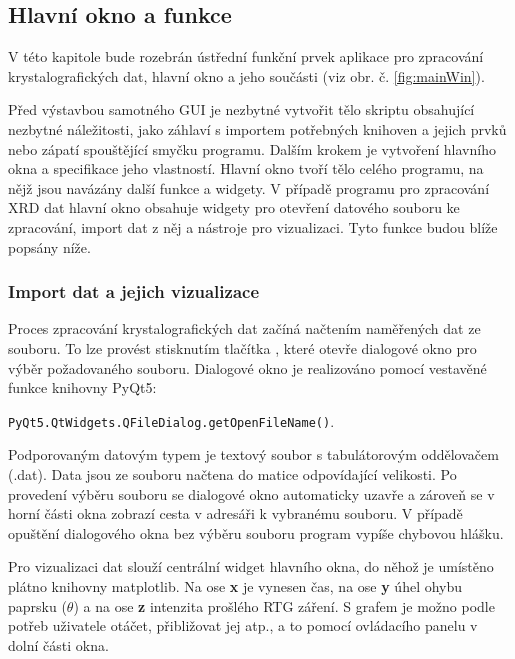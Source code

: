 \documentclass[a4paper, 12pt]{article}
\begin{document}
\subsection{Hlavní okno a funkce} \label{sec:mainwin}
V této kapitole bude rozebrán ústřední funkční prvek aplikace pro zpracování krystalografických dat, hlavní okno a jeho součásti (viz obr. č. \ref{fig:mainWin}).

Před výstavbou samotného GUI je nezbytné vytvořit tělo skriptu obsahující nezbytné náležitosti, jako záhlaví s importem potřebných knihoven a jejich prvků nebo zápatí spouštějící smyčku programu. Dalším krokem je vytvoření hlavního okna a specifikace jeho vlastností. Hlavní okno tvoří tělo celého programu, na nějž jsou navázány další funkce a widgety. V případě programu pro zpracování XRD dat hlavní okno obsahuje widgety pro otevření datového souboru ke zpracování, import dat z něj a nástroje pro vizualizaci. Tyto funkce budou blíže popsány níže.

\subsubsection{Import dat a jejich vizualizace} \label{sec:import}
Proces zpracování krystalografických dat začíná načtením naměřených dat ze souboru. To lze provést stisknutím tlačítka , které otevře dialogové okno pro výběr požadovaného souboru. Dialogové okno je realizováno pomocí vestavěné funkce knihovny PyQt5:
\begin{center}
 \texttt{PyQt5.QtWidgets.QFileDialog.getOpenFileName()}.   
\end{center}
\noindent Podporovaným datovým typem je textový soubor s tabulátorovým oddělovačem (.dat). Data jsou ze souboru načtena do matice odpovídající velikosti. Po provedení výběru souboru se dialogové okno automaticky uzavře a zároveň se v horní části okna zobrazí cesta v adresáři k vybranému souboru. V případě opuštění dialogového okna bez výběru souboru program vypíše chybovou hlášku. 

Pro vizualizaci dat slouží centrální widget hlavního okna, do něhož je umístěno plátno knihovny matplotlib. Na ose \textbf{x} je vynesen čas, na ose \textbf{y} úhel ohybu paprsku ($\theta$) a na ose \textbf{z} intenzita prošlého RTG záření. S grafem je možno podle potřeb uživatele otáčet, přibližovat jej atp., a to pomocí ovládacího panelu v dolní části okna.
\end{document}
